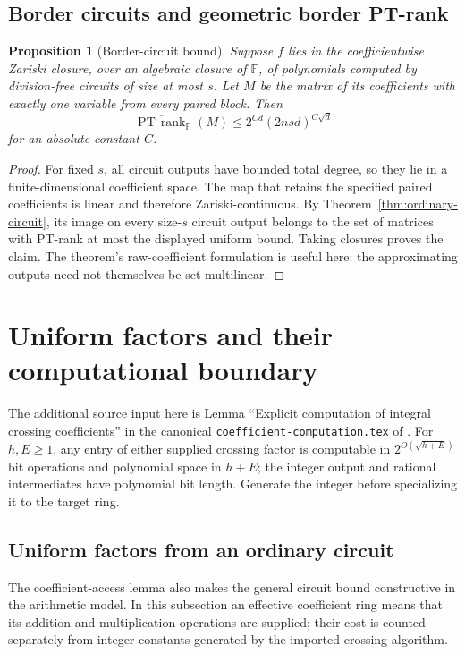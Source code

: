 \documentclass[11pt]{article}
\newtheorem{proposition}[theorem]{Proposition}
\theoremstyle{definition}
\theoremstyle{remark}
\newcommand{\F}{\mathbb F}
\newcommand{\PT}{\operatorname{PT\!\text{-}rank}}
\begin{document}
\subsection{Border circuits and geometric border PT-rank}

\begin{proposition}[Border-circuit bound]
\label{prop:border-circuit}
Suppose $f$ lies in the coefficientwise Zariski closure, over an
algebraic closure of $\F$, of polynomials computed by division-free
circuits of size at most $s$.  Let $M$ be the matrix of its
coefficients with exactly one variable from every paired block.
Then
\[
 \overline{\PT}_{\F}(M)
 \le 2^{Cd}(2nsd)^{C\sqrt d}
\]
for an absolute constant $C$.
\end{proposition}

\begin{proof}
For fixed $s$, all circuit outputs have bounded total degree,
so they lie in a finite-dimensional coefficient space.  The map
that retains the specified paired coefficients is linear and
therefore Zariski-continuous.  By
Theorem~\ref{thm:ordinary-circuit}, its image on every size-$s$
circuit output belongs to the set of matrices with PT-rank at
most the displayed uniform bound.  Taking closures proves the
claim.  The theorem's raw-coefficient formulation is useful here:
the approximating outputs need not themselves be set-multilinear.
\end{proof}

\section{Uniform factors and their computational boundary}
The additional source input here is Lemma ``Explicit computation of
integral crossing coefficients'' in the canonical
\texttt{coefficient-computation.tex} of \cite{integralcrossing}.
For $h,E\ge1$, any entry of either supplied crossing factor is computable
in $2^{O(\sqrt{h+E})}$ bit operations and polynomial space in $h+E$;
the integer output and rational intermediates have polynomial bit length.
Generate the integer before specializing it to the target ring.
\subsection{Uniform factors from an ordinary circuit}

The coefficient-access lemma also makes the general circuit
bound constructive in the arithmetic model.  In this
subsection an effective coefficient ring means that its
addition and multiplication operations are supplied; their
cost is counted separately from integer constants generated
by the imported crossing algorithm.
\end{document}
